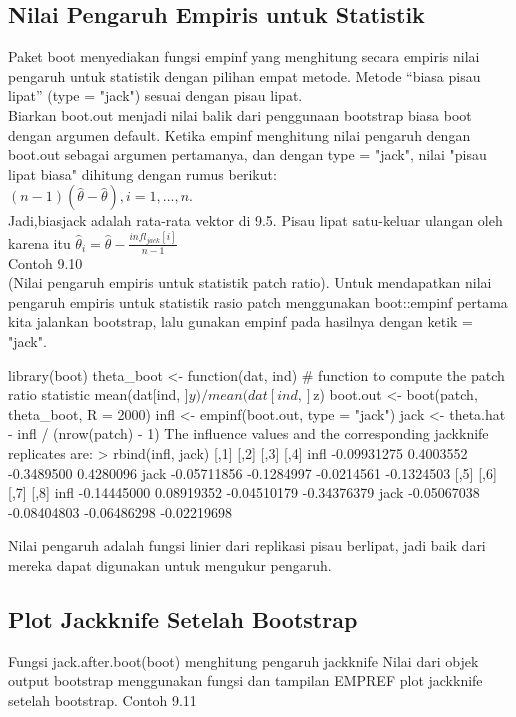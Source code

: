 \documentclass[a4paper,12pt]{article}
\theoremstyle{definition}
\begin{document}
\subsection{Nilai Pengaruh Empiris untuk Statistik}
Paket boot menyediakan fungsi empinf yang menghitung secara empiris
nilai pengaruh untuk statistik dengan pilihan empat metode. Metode “biasa
pisau lipat” (type = "jack") sesuai dengan pisau lipat.\\
Biarkan boot.out menjadi nilai balik dari penggunaan bootstrap biasa
boot dengan argumen default. Ketika empinf menghitung nilai pengaruh dengan
boot.out sebagai argumen pertamanya, dan dengan type = "jack", nilai "pisau lipat biasa" dihitung dengan rumus berikut:\\
$(n-1)(\widehat{\theta}-\widehat{\theta}),       i=1,...,n.$\\
Jadi,biasjack adalah rata-rata vektor di 9.5. Pisau lipat satu-keluar ulangan oleh karena itu
$\widehat{\theta}_{i}=\widehat{\theta }-\frac{infl_{jack}[i]}{n-1}$\\

Contoh 9.10\\

(Nilai pengaruh empiris untuk statistik patch ratio).
Untuk mendapatkan nilai pengaruh empiris untuk statistik rasio patch menggunakan boot::empinf pertama kita jalankan bootstrap, lalu gunakan empinf pada hasilnya dengan ketik = "jack".\\
\begin{spverbatim}
library(boot)
theta_boot <- function(dat, ind) {
# function to compute the patch ratio statistic
mean(dat[ind, ]$y) / mean(dat[ind, ]$z)
}
boot.out <- boot(patch, theta_boot, R = 2000)
infl <- empinf(boot.out, type = "jack")
jack <- theta.hat - infl / (nrow(patch) - 1)
The influence values and the corresponding jackknife replicates are:
> rbind(infl, jack)
[,1] [,2] [,3] [,4]
infl -0.09931275 0.4003552 -0.3489500 0.4280096
jack -0.05711856 -0.1284997 -0.0214561 -0.1324503
[,5] [,6] [,7] [,8]
infl -0.14445000 0.08919352 -0.04510179 -0.34376379
jack -0.05067038 -0.08404803 -0.06486298 -0.02219698
\end{spverbatim}

Nilai pengaruh adalah fungsi linier dari replikasi pisau berlipat, jadi baik
dari mereka dapat digunakan untuk mengukur pengaruh.

\subsection{Plot Jackknife Setelah Bootstrap}
Fungsi jack.after.boot(boot) menghitung pengaruh jackknife
Nilai dari objek output bootstrap menggunakan fungsi dan tampilan EMPREF plot jackknife setelah bootstrap.
Contoh 9.11\\ 
\end{document}
